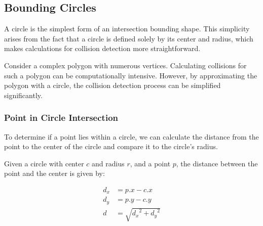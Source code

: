 \subsection{Bounding Circles}
A circle is the simplest form of an intersection bounding shape. This
simplicity arises from the fact that a circle is defined solely by its center
and radius, which makes calculations for collision detection more
straightforward.

Consider a complex polygon with numerous vertices. Calculating collisions for
such a polygon can be computationally intensive. However, by approximating the
polygon with a circle, the collision detection process can be simplified
significantly.

\begin{center}
\end{center}

\subsubsection{Point in Circle Intersection}
To determine if a point lies within a circle, we can calculate the distance
from the point to the center of the circle and compare it to the circle's
radius.

Given a circle with center $c$ and radius $r$, and a point $p$, the distance
between the point and the center is given by:

\begin{equation}
    \begin{aligned}
        d_x & = p.x - c.x                \\
        d_y & = p.y - c.y                \\
        d   & = \sqrt{{d_x}^2 + {d_y}^2}
    \end{aligned}
\end{equation}

